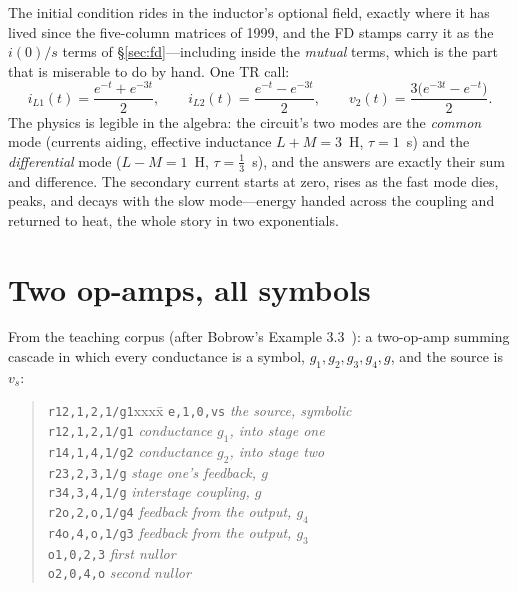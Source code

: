\documentclass[11pt,oneside]{report}
\newcommand{\code}[1]{\texttt{#1}}
\begin{document}
\noindent The initial condition rides in the inductor's optional
field, exactly where it has lived since the five-column matrices of
1999, and the FD stamps carry it as the $i(0)/s$ terms of
\S\ref{sec:fd}---including inside the \emph{mutual} terms, which is
the part that is miserable to do by hand. One TR call:
\[
i_{L1}(t) = \frac{e^{-t} + e^{-3t}}{2}, \qquad
i_{L2}(t) = \frac{e^{-t} - e^{-3t}}{2}, \qquad
v_2(t) = \frac{3\bigl(e^{-3t} - e^{-t}\bigr)}{2}.
\]
The physics is legible in the algebra: the circuit's two modes are
the \emph{common} mode (currents aiding, effective inductance $L+M =
3$~H, $\tau = 1$~s) and the \emph{differential} mode ($L-M = 1$~H,
$\tau = \tfrac13$~s), and the answers are exactly their sum and
difference. The secondary current starts at zero, rises as the fast
mode dies, peaks, and decays with the slow mode---energy handed
across the coupling and returned to heat, the whole story in two
exponentials.

\section{Two op-amps, all symbols}
\label{sec:twoopamps}

From the teaching corpus (after Bobrow's Example 3.3~\cite{bobrow}):
a two-op-amp summing cascade in which every conductance is a symbol,
$g_1, g_2, g_3, g_4, g$, and the source is $v_s$:

\begin{quote}
\begin{tabbing}
\code{r12,1,2,1/g1}xxxx\=\kill
\code{e,1,0,vs}         \> \emph{the source, symbolic} \\
\code{r12,1,2,1/g1}     \> \emph{conductance $g_1$, into stage one} \\
\code{r14,1,4,1/g2}     \> \emph{conductance $g_2$, into stage two} \\
\code{r23,2,3,1/g}      \> \emph{stage one's feedback, $g$} \\
\code{r34,3,4,1/g}      \> \emph{interstage coupling, $g$} \\
\code{r2o,2,o,1/g4}     \> \emph{feedback from the output, $g_4$} \\
\code{r4o,4,o,1/g3}     \> \emph{feedback from the output, $g_3$} \\
\code{o1,0,2,3}         \> \emph{first nullor} \\
\code{o2,0,4,o}         \> \emph{second nullor}
\end{tabbing}
\end{quote}
\end{document}
